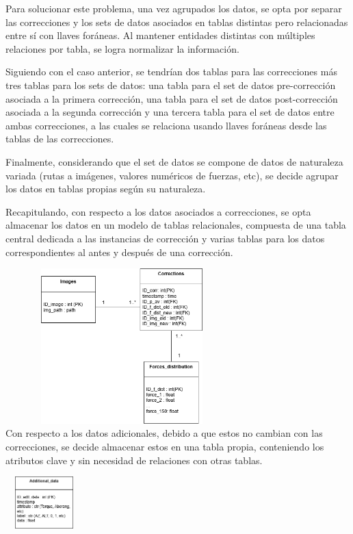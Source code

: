 Para solucionar este problema, una vez agrupados los datos, se opta por separar las correcciones y los sets de datos asociados en tablas distintas pero relacionadas entre sí con llaves foráneas. Al mantener entidades distintas con múltiples relaciones por tabla, se logra normalizar la información.

Siguiendo con el caso anterior, se tendrían dos tablas para las correcciones más tres tablas para los sets de datos: una tabla para el set de datos pre-corrección asociada a la primera corrección, una tabla para el set de datos post-corrección asociada a la segunda corrección y una tercera tabla para el set de datos entre ambas correcciones, a las cuales se relaciona usando llaves foráneas desde las tablas de las correcciones.

Finalmente, considerando que el set de datos se compone de datos de naturaleza variada (rutas a imágenes, valores numéricos de fuerzas, etc), se decide agrupar los datos en tablas propias según su naturaleza.

Recapitulando, con respecto a los datos asociados a correcciones, se opta almacenar los datos en un modelo de tablas relacionales, compuesta de una tabla central dedicada a las instancias de corrección y varias tablas para los datos correspondientes al antes y después de una corrección.

\includegraphics[width=9cm,height=6cm]{figures/db_diagram_corr.png} \\

Con respecto a los datos adicionales, debido a que estos no cambian con las correcciones, se decide almacenar estos en una tabla propia, conteniendo los atributos clave y sin necesidad de relaciones con otras tablas.

\includegraphics[width=3cm,height=2cm]{figures/db_diagram_add_data.png} \\

